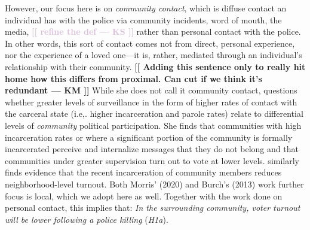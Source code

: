 \documentclass[12pt]{article}
\newcommand{\kscomment}[1]{\textbf{\textcolor{Thistle}{[[ #1 --- KS ]]}}}
\newcommand{\kmcomment}[1]{\textbf{\textcolor{JungleGreen}{[[ #1 --- KM ]]}}}
\begin{document}
However, our focus here is on \textit{community contact}, which is diffuse contact an individual has with the police via community incidents, word of mouth, the media, \kscomment{refine the def} rather than personal contact with the police. In other words, this sort of contact comes not from direct, personal experience, nor the experience of a loved one---it is, rather, mediated through an individual's relationship with their community. \kmcomment{Adding this sentence only to really hit home how this differs from proximal. Can cut if we think it's redundant} While she does not call it community contact, \cite{burch2013trading} questions whether greater levels of surveillance in the form of higher rates of contact with the carceral state (i.e,. higher incarceration and parole rates) relate to differential levels of \textit{community} political participation. She finds that communities with high incarceration rates or where a significant portion of the community is formally incarcerated perceive and internalize messages that they do not belong and that communities under greater supervision turn out to vote at lower levels. \cite{Morris2020} similarly finds evidence that the recent incarceration of community members 
reduces neighborhood-level turnout. Both Morris' (2020) and Burch's (2013) work further focus is local, which we adopt here as well. Together with the work done on personal contact, this implies that: \textit{In the surrounding community, voter turnout will be lower following a police killing} (\textit{H1a}). 
\end{document}
